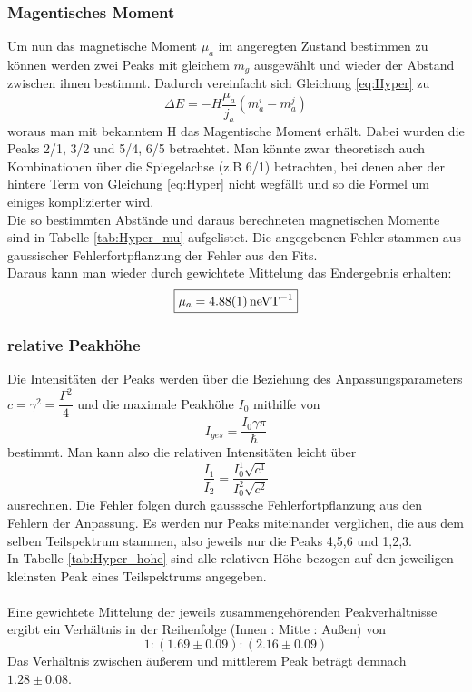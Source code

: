 \documentclass[12pt,a4paper]{article}
\begin{document}
\subsubsection{Magentisches Moment}
Um nun das magnetische Moment $\mu_a$ im angeregten Zustand bestimmen zu können werden zwei Peaks mit gleichem $m_g$ ausgewählt und wieder der Abstand zwischen ihnen bestimmt. Dadurch vereinfacht sich Gleichung \ref{eq:Hyper} zu
\begin{equation*}
\Delta E = -H\dfrac{\mu_a}{j_a}(m_{a}^i-m_{a}^j)
\end{equation*}
woraus man mit bekanntem H das Magentische Moment erhält. Dabei wurden die Peaks 2/1, 3/2 und 5/4, 6/5 betrachtet. Man könnte zwar theoretisch auch Kombinationen über die Spiegelachse (z.B 6/1) betrachten, bei denen aber der hintere Term von Gleichung \ref{eq:Hyper} nicht wegfällt und so die Formel um einiges komplizierter wird.\\
Die so bestimmten Abstände und daraus berechneten magnetischen Momente sind in Tabelle \ref{tab:Hyper_mu} aufgelistet. Die angegebenen Fehler stammen aus gaussischer Fehlerfortpflanzung der Fehler aus den Fits.\\
Daraus kann man wieder durch gewichtete Mittelung das Endergebnis erhalten:
\begin{equation*}
\boxed{\mu_a = \SI{4.88\pm 0.01}{neVT^{-1}}}
\end{equation*}

\subsubsection{relative Peakhöhe}

Die Intensitäten der Peaks werden über die Beziehung des Anpassungsparameters $c = \gamma^2 = \dfrac{\Gamma^2}{4}$ und die maximale Peakhöhe $I_0$ mithilfe von
\begin{equation}
I_{ges} = \dfrac{I_0 \gamma \pi}{\hbar}
\end{equation}
bestimmt. Man kann also die relativen Intensitäten leicht über
\begin{equation}
\dfrac{I_1}{I_2} = \dfrac{I_0^1 \sqrt{c^1}}{I_0^2 \sqrt{c^2}}
\end{equation}
ausrechnen. Die Fehler folgen durch gausssche Fehlerfortpflanzung aus den Fehlern der Anpassung. Es werden nur Peaks miteinander verglichen, die aus dem selben Teilspektrum stammen, also jeweils nur die Peaks 4,5,6 und 1,2,3.\\
In Tabelle \ref{tab:Hyper_hohe} sind alle relativen Höhe bezogen auf den jeweiligen kleinsten Peak eines Teilspektrums angegeben.\\
\\
Eine gewichtete Mittelung der jeweils zusammengehörenden Peakverhältnisse ergibt ein Verhältnis in der Reihenfolge (Innen : Mitte : Außen) von
\begin{equation*}
\boxed{1:(1.69\pm0.09):(2.16\pm0.09)}
\end{equation*}
Das Verhältnis zwischen äußerem und mittlerem Peak beträgt demnach $1.28\pm0.08$.
\end{document}
